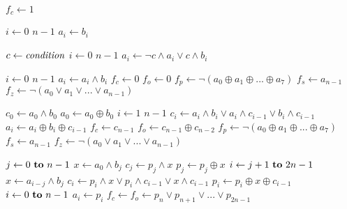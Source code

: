 \documentclass{beamer}
\renewcommand{\gets}{\leftarrow}
\newcommand{\AND}{\land}
\newcommand{\IOR}{\lor}
\newcommand{\XOR}{\oplus}
\newcommand{\NOT}{\lnot}
\begin{document}
\begin{frame}
\begin{codebox}
\zi $f_c \gets 1$
\end{codebox}
\end{frame}

\begin{frame}
\begin{codebox}
\zi \For $i \gets 0$ \To $n-1$
\zi \Do
      $a_i \gets b_i$
    \End
\end{codebox}
\end{frame}

\begin{frame}
\begin{codebox}
\zi $c \gets \id{condition}$
\zi \For $i \gets 0$ \To $n-1$
\zi \Do
      $a_i \gets \NOT c \AND a_i \IOR c \AND b_i$
    \End
\end{codebox}
\end{frame}

\begin{frame}
\begin{codebox}
\zi \For $i \gets 0$ \To $n-1$ \Do
\zi   $a_i \gets a_i \AND b_i$ \End
\zi $f_c \gets 0$
\zi $f_o \gets 0$
\zi $f_p \gets \NOT(a_0 \XOR a_1 \XOR ... \XOR a_7)$
\zi $f_s \gets a_{n-1}$
\zi $f_z \gets \NOT(a_0 \IOR a_1 \IOR ... \IOR a_{n-1})$
\end{codebox}
\end{frame}

\begin{frame}
\begin{codebox}
\zi $c_0 \gets a_0 \AND b_0$
\zi $a_0 \gets a_0 \XOR b_0$
\zi \For $i \gets 1$ \To $n-1$ \Do
\zi   $c_i \gets a_i \AND b_i \IOR a_i \AND c_{i-1} \IOR b_i \AND c_{i-1}$
\zi   $a_i \gets a_i \XOR b_i \XOR c_{i-1}$ \End
\zi $f_c \gets c_{n-1}$
\zi $f_o \gets c_{n-1} \XOR c_{n-2}$
\zi $f_p \gets \NOT(a_0 \XOR a_1 \XOR ... \XOR a_7)$
\zi $f_s \gets a_{n-1}$
\zi $f_z \gets \NOT(a_0 \IOR a_1 \IOR ... \IOR a_{n-1})$
\end{codebox}
\end{frame}

\begin{frame}
\begin{codebox}
\zi \For $j \gets 0 \To n-1$ \Do
\zi   $x \gets a_{0} \AND b_{j}$
\zi   $c_{j} \gets p_{j} \AND x$
\zi   $p_{j} \gets p_{j} \XOR x$
\zi   \For $i \gets j+1 \To 2n-1$ \Do
\zi     $x \gets a_{i-j} \AND b_{j}$
\zi     $c_{i} \gets p_{i} \AND x \IOR p_{i} \AND c_{i-1} \IOR x \AND c_{i-1}$
\zi     $p_{i} \gets p_{i} \XOR x \XOR c_{i-1}$ \End \End
\zi \For $i \gets 0 \To n-1$ \Do
\zi   $a_{i} \gets p_{i}$ \End
\zi $f_c \gets f_o \gets p_{n} \IOR p_{n+1} \IOR ... \IOR p_{2n-1}$
\end{codebox}
\end{frame}
\end{document}
